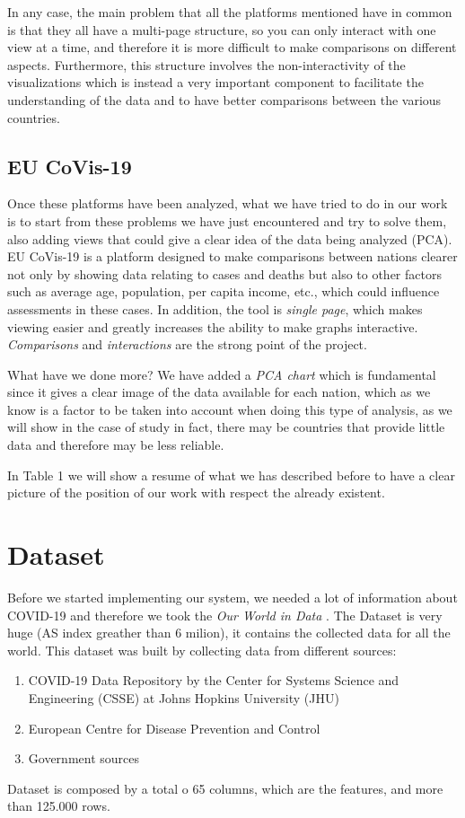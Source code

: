 \documentclass[10pt,conference]{IEEEtran}
\begin{document}
In any case, the main problem that all the platforms mentioned have in common is that they all have a multi-page structure, so you 
can only interact with one view at a time, and therefore it is more difficult to make comparisons on different aspects. Furthermore, 
this structure involves the non-interactivity of the visualizations which is instead a very important component to facilitate the 
understanding of the data and to have better comparisons between the various countries.

\subsection{EU CoVis-19}
Once these platforms have been analyzed, what we have tried to do in our work is to start from these problems we have just encountered 
and try to solve them, also adding views that could give a clear idea of the data being analyzed (PCA). EU CoVis-19 is a platform 
designed to make comparisons between nations clearer not only by showing data relating to cases and deaths but also to other factors 
such as average age, population, per capita income, etc., which could influence assessments in these cases. In addition, the tool is 
{\em single page}, which makes viewing easier and greatly increases the ability to make graphs interactive. {\em Comparisons} and {\em interactions} are 
the strong point of the project.

What have we done more? We have added a {\em PCA chart} which is fundamental since it gives a clear image of the data available for 
each nation, which as we know is a factor to be taken into account when doing this type of analysis, as we will show in the case of study 
in fact, there may be countries that provide little data and therefore may be less reliable.

In Table 1 we will show a resume of what we has described before to have a clear picture of the position of our work with respect the already existent.


\section{Dataset}
Before we started implementing our system, we needed a lot of information about COVID-19 and therefore we took the  
{\it Our World in Data} \cite{dataset}. The Dataset is very huge (AS index greather than 6 milion), it contains the collected data for all the world. 
This dataset was built by collecting data from different sources:
\begin{enumerate}
	\item COVID-19 Data Repository by the Center for Systems Science and Engineering (CSSE) at Johns Hopkins University (JHU)
	\item European Centre for Disease Prevention and Control
	\item Government sources
\end{enumerate}
\bigskip
Dataset is composed by a total o 65 columns, which are the features, and more than 125.000 rows. 
\end{document}
